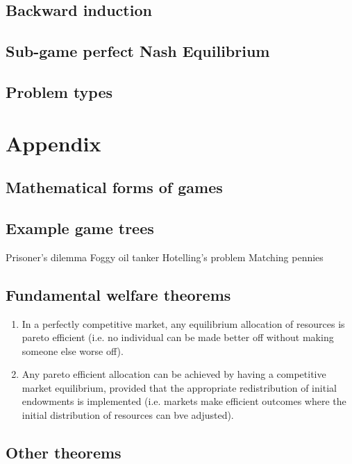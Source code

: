 \documentclass{article}
\begin{document}
\subsection{Backward induction}

\subsection{Sub-game perfect Nash Equilibrium}

\subsection{Problem types}




\section{Appendix}

\subsection{Mathematical forms of games}

\subsection{Example game trees}
Prisoner's dilemma 
Foggy oil tanker 
Hotelling's problem 
Matching pennies 

\subsection{Fundamental welfare theorems}
\begin{enumerate}
    \item In a perfectly competitive market, any equilibrium allocation of resources is pareto efficient (i.e. no individual can be made better off without making someone else worse off).
    \item Any pareto efficient allocation can be achieved by having a competitive market equilibrium, provided that the appropriate redistribution of initial endowments is implemented (i.e. markets make efficient outcomes where the initial distribution of resources can bve adjusted). 
\end{enumerate}


\subsection{Other theorems}
\end{document}
